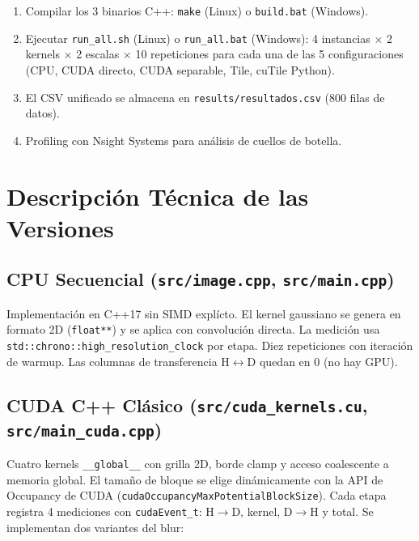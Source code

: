 \documentclass[12pt,a4paper]{article}
\begin{document}
\begin{enumerate}
  \item Compilar los 3 binarios C++: \texttt{make} (Linux) o \texttt{build.bat} (Windows).
  \item Ejecutar \texttt{run\_all.sh} (Linux) o \texttt{run\_all.bat} (Windows): 4 instancias $\times$ 2 kernels $\times$ 2 escalas $\times$ 10 repeticiones para cada una de las 5 configuraciones (CPU, CUDA directo, CUDA separable, Tile, cuTile Python).
  \item El CSV unificado se almacena en \texttt{results/resultados.csv} (800 filas de datos).
  \item Profiling con Nsight Systems para an\'alisis de cuellos de botella.
\end{enumerate}

\section{Descripci\'on T\'ecnica de las Versiones}

\subsection{CPU Secuencial (\texttt{src/image.cpp}, \texttt{src/main.cpp})}

Implementaci\'on en C++17 sin SIMD expl\'icto. El kernel gaussiano se genera en formato 2D (\texttt{float**}) y se aplica con convoluci\'on directa. La medici\'on usa \texttt{std::chrono::high\_resolution\_clock} por etapa. Diez repeticiones con iteraci\'on de warmup. Las columnas de transferencia H$\leftrightarrow$D quedan en 0 (no hay GPU).

\subsection{CUDA C++ Cl\'asico (\texttt{src/cuda\_kernels.cu}, \texttt{src/main\_cuda.cpp})}

Cuatro kernels \texttt{\_\_global\_\_} con grilla 2D, borde clamp y acceso coalescente a memoria global. El tama\~no de bloque se elige din\'amicamente con la API de Occupancy de CUDA (\texttt{cudaOccupancyMaxPotentialBlockSize}). Cada etapa registra 4 mediciones con \texttt{cudaEvent\_t}: H$\rightarrow$D, kernel, D$\rightarrow$H y total. Se implementan dos variantes del blur:
\end{document}
